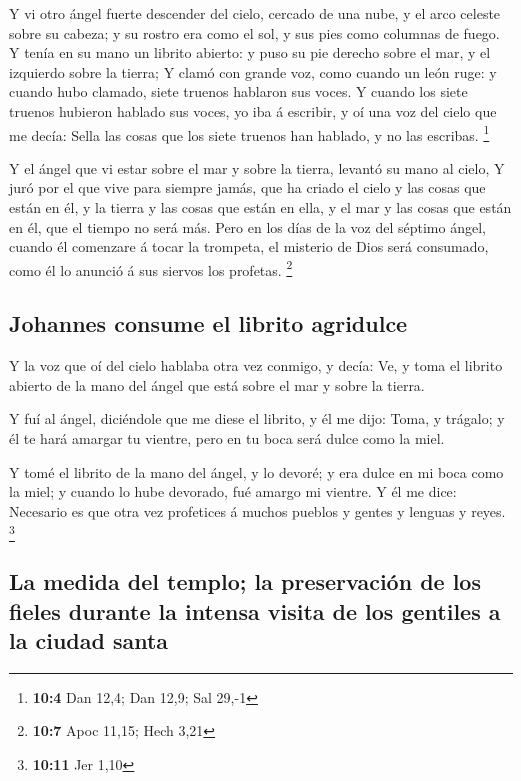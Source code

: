  Y vi otro ángel fuerte descender del cielo, cercado de una
nube, y el arco celeste sobre su cabeza; y su rostro era como el sol, y
sus pies como columnas de fuego.  Y tenía en su mano un
librito abierto: y puso su pie derecho sobre el mar, y el izquierdo
sobre la tierra;  Y clamó con grande voz, como cuando un
león ruge: y cuando hubo clamado, siete truenos hablaron sus voces.
 Y cuando los siete truenos hubieron hablado sus voces, yo
iba á escribir, y oí una voz del cielo que me decía: Sella las cosas que
los siete truenos han hablado, y no las escribas. \footnote{\textbf{10:4}
  Dan 12,4; Dan 12,9; Sal 29,-1}

 Y el ángel que vi estar sobre el mar y sobre la tierra,
levantó su mano al cielo,  Y juró por el que vive para
siempre jamás, que ha criado el cielo y las cosas que están en él, y la
tierra y las cosas que están en ella, y el mar y las cosas que están en
él, que el tiempo no será más.  Pero en los días de la voz
del séptimo ángel, cuando él comenzare á tocar la trompeta, el misterio
de Dios será consumado, como él lo anunció á sus siervos los profetas.
\footnote{\textbf{10:7} Apoc 11,15; Hech 3,21}

\hypertarget{johannes-consume-el-librito-agridulce}{%
\subsection{Johannes consume el librito
agridulce}\label{johannes-consume-el-librito-agridulce}}

 Y la voz que oí del cielo hablaba otra vez conmigo, y
decía: Ve, y toma el librito abierto de la mano del ángel que está sobre
el mar y sobre la tierra.

 Y fuí al ángel, diciéndole que me diese el librito, y él me
dijo: Toma, y trágalo; y él te hará amargar tu vientre, pero en tu boca
será dulce como la miel.

 Y tomé el librito de la mano del ángel, y lo devoré; y era
dulce en mi boca como la miel; y cuando lo hube devorado, fué amargo mi
vientre.  Y él me dice: Necesario es que otra vez
profetices á muchos pueblos y gentes y lenguas y reyes. \footnote{\textbf{10:11}
  Jer 1,10}

\hypertarget{la-medida-del-templo-la-preservaciuxf3n-de-los-fieles-durante-la-intensa-visita-de-los-gentiles-a-la-ciudad-santa}{%
\subsection{La medida del templo; la preservación de los fieles durante
la intensa visita de los gentiles a la ciudad
santa}\label{la-medida-del-templo-la-preservaciuxf3n-de-los-fieles-durante-la-intensa-visita-de-los-gentiles-a-la-ciudad-santa}}


